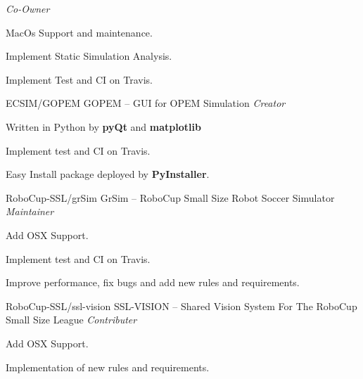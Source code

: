\begin{cventries}
    {\textit{Co-Owner}} %
    {} %
    {
      \begin{cvitems} %
        \item {MacOs Support and maintenance.}
        \item {Implement Static Simulation Analysis.}
        \item {Implement Test and CI on Travis.}
      \end{cvitems}
    }
        \newline
  \cventry
    {ECSIM/GOPEM} %
    {GOPEM -- GUI for OPEM Simulation} %
    {\textit{Creator}} %
    {} %
    {
      \begin{cvitems} %
        \item {Written in Python by \textbf{pyQt} and \textbf{matplotlib}}
        \item {Implement test and CI on Travis.}
        \item {Easy Install package deployed by \textbf{PyInstaller}.}
      \end{cvitems}
    }

\end{cventries}


\begin{cventries}
  \cventry
    {RoboCup-SSL/grSim} %
    {GrSim -- RoboCup Small Size Robot Soccer Simulator } %
    {\textit{Maintainer}} %
    {} %
    {
      \begin{cvitems} %
        \item {Add OSX Support.}
        \item {Implement test and CI on Travis.}
        \item {Improve performance, fix bugs and add new rules and requirements.}
      \end{cvitems}
    }

  \cventry
    {RoboCup-SSL/ssl-vision} %
    {SSL-VISION -- Shared Vision System For The RoboCup Small Size League} %
    {\textit{Contributer}} %
    {} %
    {
      \begin{cvitems} %
        \item {Add OSX Support.}
        \item {Implementation of new rules and requirements.}
      \end{cvitems}
    }
\end{cventries}

